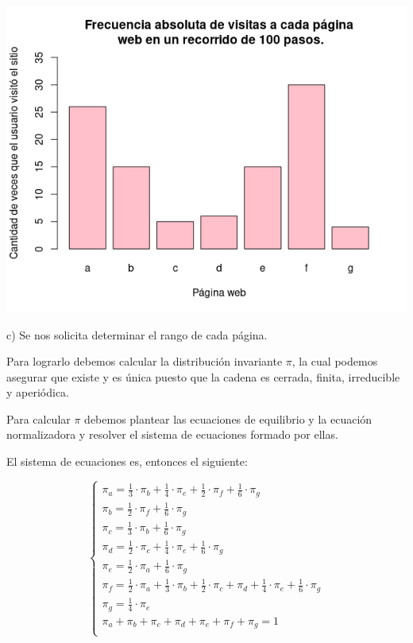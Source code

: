 \documentclass[11pt]{article}
\begin{document}
\begin{center}\includegraphics[scale = 0.55]{P5Barplot.png}\end{center}

c) Se nos solicita determinar el rango de cada página.

Para lograrlo debemos calcular la distribución invariante $\pi$, la cual podemos asegurar que existe y es única puesto que la cadena es cerrada, finita, irreducible y aperiódica. 

Para calcular $\pi$ debemos plantear las ecuaciones de equilibrio y la ecuación normalizadora y resolver el sistema de ecuaciones formado por ellas. 

El sistema de ecuaciones es, entonces el siguiente: 

\begin{equation*}
    \begin{cases}
        \pi_a = \frac{1}{3} \cdot \pi_b + \frac{1}{4} \cdot \pi_e + \frac{1}{2} \cdot \pi_f + \frac{1}{6} \cdot \pi_g \\
        \pi_b = \frac{1}{2} \cdot \pi_f + \frac{1}{6} \cdot \pi_g \\
        \pi_c = \frac{1}{3} \cdot \pi_b + \frac{1}{6} \cdot \pi_g \\
        \pi_d = \frac{1}{2} \cdot \pi_c + \frac{1}{4} \cdot \pi_e + \frac{1}{6} \cdot \pi_g \\
        \pi_e = \frac{1}{2} \cdot \pi_a + \frac{1}{6} \cdot \pi_g \\
        \pi_f = \frac{1}{2} \cdot \pi_a + \frac{1}{3} \cdot \pi_b + \frac{1}{2} \cdot \pi_c + \pi_d + \frac{1}{4} \cdot \pi_e + \frac{1}{6} \cdot \pi_g \\
        \pi_g = \frac{1}{4} \cdot \pi_e \\
        \pi_a + \pi_b + \pi_c + \pi_d + \pi_e + \pi_f + \pi_g = 1 \\
    \end{cases}
\end{equation*}
\end{document}
